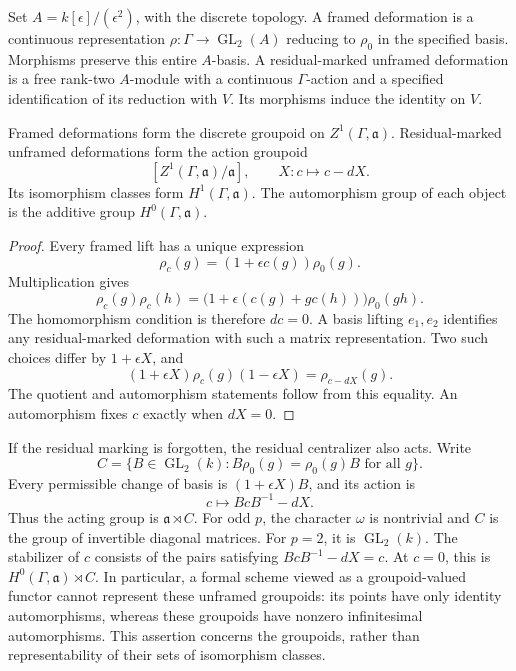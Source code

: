 Set \(A=k[\epsilon]/(\epsilon^2)\), with the discrete topology.
A framed deformation is a continuous representation
\(\rho:\Gamma\to\operatorname{GL}_2(A)\) reducing to \(\rho_0\) in the specified basis.
Morphisms preserve this entire \(A\)-basis.
A residual-marked unframed deformation is a free rank-two \(A\)-module
with a continuous \(\Gamma\)-action and a specified identification of its
reduction with \(V\). Its morphisms induce the identity on \(V\).

\begin{proposition}
\label{v4-arith:local-cyclotomic:groupoids}
Framed deformations form the discrete groupoid on \(Z^1(\Gamma,\mathfrak a)\).
Residual-marked unframed deformations form the action groupoid
\[
 [Z^1(\Gamma,\mathfrak a)/\mathfrak a],\qquad
 X:c\longmapsto c-dX.
\]
Its isomorphism classes form \(H^1(\Gamma,\mathfrak a)\).
The automorphism group of each object is the additive group
\(H^0(\Gamma,\mathfrak a)\).
\end{proposition}

\begin{proof}
Every framed lift has a unique expression
\[
 \rho_c(g)=(1+\epsilon c(g))\rho_0(g).
\]
Multiplication gives
\[
 \rho_c(g)\rho_c(h)
 =\bigl(1+\epsilon(c(g)+gc(h))\bigr)\rho_0(gh).
\]
The homomorphism condition is therefore \(dc=0\).
A basis lifting \(e_1,e_2\) identifies any residual-marked deformation
with such a matrix representation. Two such choices differ by
\(1+\epsilon X\), and
\[
 (1+\epsilon X)\rho_c(g)(1-\epsilon X)=\rho_{c-dX}(g).
\]
The quotient and automorphism statements follow from this equality.
An automorphism fixes \(c\) exactly when \(dX=0\).
\end{proof}

If the residual marking is forgotten, the residual centralizer also acts.
Write
\[
 C=\{B\in\operatorname{GL}_2(k):B\rho_0(g)=\rho_0(g)B\text{ for all }g\}.
\]
Every permissible change of basis is \((1+\epsilon X)B\), and its action is
\[
 c\longmapsto BcB^{-1}-dX.
\]
Thus the acting group is \(\mathfrak a\rtimes C\).
For odd \(p\), the character \(\omega\) is nontrivial and \(C\) is the group of invertible diagonal matrices.
For \(p=2\), it is \(\operatorname{GL}_2(k)\).
The stabilizer of \(c\) consists of the pairs satisfying
\(BcB^{-1}-dX=c\). At \(c=0\), this is
\(H^0(\Gamma,\mathfrak a)\rtimes C\).
In particular, a formal scheme viewed as a groupoid-valued functor
cannot represent these unframed groupoids: its points have only identity
automorphisms, whereas these groupoids have nonzero infinitesimal automorphisms.
This assertion concerns the groupoids, rather than representability of
their sets of isomorphism classes.

